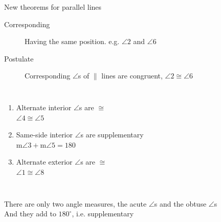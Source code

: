 \begin{frame}{New theorems for parallel lines}
  \begin{description}
    \item[Corresponding]  Having the same position. e.g. $\angle 2$ and $\angle 6$
    \item[Postulate] Corresponding $\angle$s of $\parallel$ lines are congruent, 
    $\angle 2 \cong \angle 6$
  \end{description} \bigskip
    \begin{columns}
      \begin{enumerate}
        \item Alternate interior  $\angle$s are $\cong$\\
        $\angle 4 \cong \angle 5$
        \item Same-side interior $\angle$s are supplementary\\
        m$\angle 3 + \text{m}\angle 5 =  180$
        \item Alternate exterior  $\angle$s are $\cong$\\
        $\angle 1 \cong \angle 8$
      \end{enumerate}
    \end{columns} \vspace{0.7cm}
    There are only two angle measures, the acute $\angle$s and the obtuse $\angle$s \\
    And they add to $180^\circ$, i.e. supplementary
  \end{frame}

